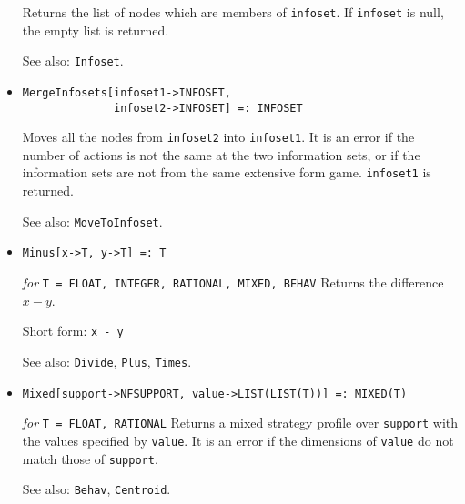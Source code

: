 \begin{itemize}
\bd
Returns the list of nodes which are members of \verb+infoset+.  If
\verb+infoset+ is null, the empty list is returned.
\item [See also:] \verb+Infoset+.
\ed

\item{}
\protect \large \begin{verbatim}
MergeInfosets[infoset1->INFOSET,
              infoset2->INFOSET] =: INFOSET
\end{verbatim}\normalsize

\bd
Moves all the nodes from \verb+infoset2+ into \verb+infoset1+.
It is an error if the number of actions is not the same at the
two information sets, or if the information sets are not from the
same extensive form game.  \verb+infoset1+ is returned.
\item [See also:] \verb+MoveToInfoset+.
\ed

\item 
\protect \large \begin{verbatim}
Minus[x->T, y->T] =: T
\end{verbatim} \normalsize

{\it for} {\tt T = FLOAT, INTEGER, RATIONAL, MIXED, BEHAV}
\bd
Returns the difference $x - y$.
\item [Short form:] \verb+x - y+
\item [See also:] \verb+Divide+, \verb+Plus+, \verb+Times+.
\ed

\item{}
\protect \large \begin{verbatim}
Mixed[support->NFSUPPORT, value->LIST(LIST(T))] =: MIXED(T)
\end{verbatim}\normalsize

{\it for} {\tt T = FLOAT, RATIONAL}
\bd
Returns a mixed strategy profile over \verb+support+ with the values
specified by \verb+value+.  It is an error if the dimensions of
\verb+value+ do not match those of \verb+support+.
\item [See also:] \verb+Behav+, \verb+Centroid+.
\ed




\end{itemize}
